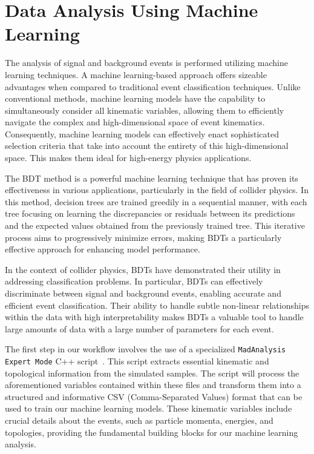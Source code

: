 
\section{Data Analysis Using Machine Learning}\label{sec:ML}
The analysis of signal and background events is performed utilizing machine learning techniques. A machine learning-based approach offers sizeable advantages when compared to traditional event classification techniques. Unlike conventional methods, machine learning models have the capability to simultaneously consider all kinematic variables, allowing them to efficiently navigate the complex and high-dimensional space of event kinematics. Consequently, machine learning models can effectively enact sophisticated selection criteria that take into account the entirety of this high-dimensional space. This makes them ideal for high-energy physics applications.

The BDT method is a powerful machine learning technique that has proven its effectiveness in various applications, particularly in the field of collider physics. In this method, decision trees are trained greedily in a sequential manner, with each tree focusing on learning the discrepancies or residuals between its predictions and the expected values obtained from the previously trained tree. This iterative process aims to progressively minimize errors, making BDTs a particularly effective approach for enhancing model performance.

In the context of collider physics, BDTs have demonstrated their utility in addressing classification problems. In particular, BDTs can effectively discriminate between signal and background events, enabling accurate and efficient event classification. Their ability to handle subtle non-linear relationships within the data with high interpretability makes BDTs a valuable tool to handle large amounts of data with a large number of parameters for each event. 

The first step in our workflow involves the use of a specialized \texttt{MadAnalysis Expert Mode} C++ script~\parencite{CONTE2013222}. This script extracts essential kinematic and topological information from the simulated samples. The script will process the aforementioned variables contained within these files and transform them into a structured and informative CSV (Comma-Separated Values) format that can be used to train our machine learning models. These kinematic variables include crucial details about the events, such as particle momenta, energies, and topologies, providing the fundamental building blocks for our machine learning analysis. 

